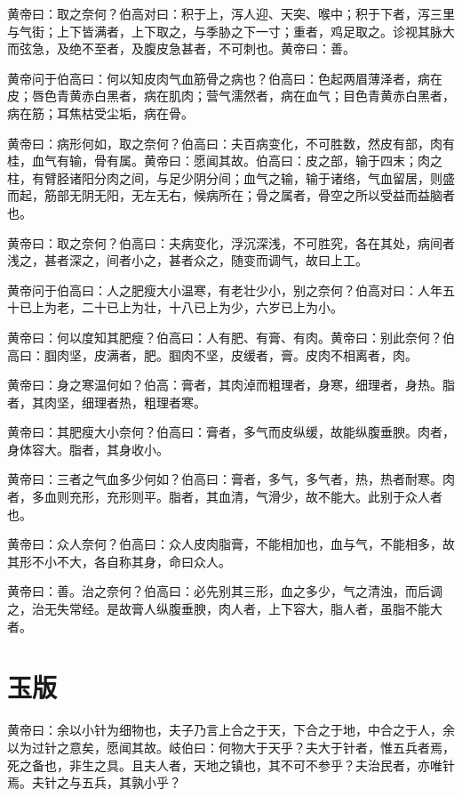 \documentclass[12pt,UTF8]{ctexbook}
\begin{document}
	黄帝曰：取之奈何？伯高对曰：积于上，泻人迎、天突、喉中；积于下者，泻三里与气街；上下皆满者，上下取之，与季胁之下一寸；重者，鸡足取之。诊视其脉大而弦急，及绝不至者，及腹皮急甚者，不可刺也。黄帝曰：善。
	
	黄帝问于伯高曰：何以知皮肉气血筋骨之病也？伯高曰：色起两眉薄泽者，病在皮；唇色青黄赤白黑者，病在肌肉；营气濡然者，病在血气；目色青黄赤白黑者，病在筋；耳焦枯受尘垢，病在骨。
	
	黄帝曰：病形何如，取之奈何？伯高曰：夫百病变化，不可胜数，然皮有部，肉有桂，血气有输，骨有属。黄帝曰：愿闻其故。伯高曰：皮之部，输于四末；肉之柱，有臂胫诸阳分肉之间，与足少阴分间；血气之输，输于诸络，气血留居，则盛而起，筋部无阴无阳，无左无右，候病所在；骨之属者，骨空之所以受益而益脑者也。
	
	黄帝曰：取之奈何？伯高曰：夫病变化，浮沉深浅，不可胜究，各在其处，病间者浅之，甚者深之，间者小之，甚者众之，随变而调气，故曰上工。
	
	黄帝问于伯高曰：人之肥瘦大小温寒，有老壮少小，别之奈何？伯高对曰：人年五十已上为老，二十已上为壮，十八已上为少，六岁已上为小。
	
	黄帝曰：何以度知其肥瘦？伯高曰：人有肥、有膏、有肉。黄帝曰：别此奈何？伯高曰：腘肉坚，皮满者，肥。腘肉不坚，皮缓者，膏。皮肉不相离者，肉。
	
	黄帝曰：身之寒温何如？伯高：膏者，其肉淖而粗理者，身寒，细理者，身热。脂者，其肉坚，细理者热，粗理者寒。
	
	黄帝曰：其肥瘦大小奈何？伯高曰：膏者，多气而皮纵缓，故能纵腹垂腴。肉者，身体容大。脂者，其身收小。
	
	黄帝曰：三者之气血多少何如？伯高曰：膏者，多气，多气者，热，热者耐寒。肉者，多血则充形，充形则平。脂者，其血清，气滑少，故不能大。此别于众人者也。
	
	黄帝曰：众人奈何？伯高曰：众人皮肉脂膏，不能相加也，血与气，不能相多，故其形不小不大，各自称其身，命曰众人。
	
	黄帝曰：善。治之奈何？伯高曰：必先别其三形，血之多少，气之清浊，而后调之，治无失常经。是故膏人纵腹垂腴，肉人者，上下容大，脂人者，虽脂不能大者。
	\chapter{玉版}
	
	黄帝曰：余以小针为细物也，夫子乃言上合之于天，下合之于地，中合之于人，余以为过针之意矣，愿闻其故。岐伯曰：何物大于天乎？夫大于针者，惟五兵者焉，死之备也，非生之具。且夫人者，天地之镇也，其不可不参乎？夫治民者，亦唯针焉。夫针之与五兵，其孰小乎？
	
\end{document}
